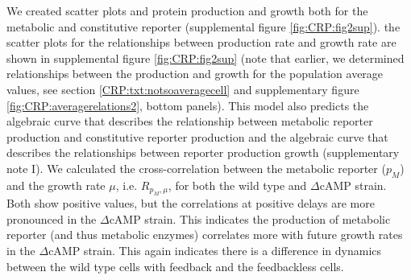 We created scatter plots and  protein production and growth  
both for the metabolic and constitutive reporter (supplemental figure \ref{fig:CRP:fig2sup}).
%
the scatter plots for the relationships between production rate and growth rate are shown in supplemental figure \ref{fig:CRP:fig2sup}
(note that earlier, we determined relationships between the production and growth for the population average values, see section \ref{CRP:txt:notsoaveragecell} and supplementary figure \ref{fig:CRP:averagerelations2}, bottom panels).
%
This model also predicts the algebraic curve that describes the relationship between metabolic reporter production and constitutive reporter production 
and the algebraic curve that describes the relationships between reporter production growth (supplementary note I).
%
%
%
%
%
We calculated the cross-correlation between the metabolic reporter ($p_M$) and the growth rate $\mu$,
i.e. $R_{p_M,\mu}$,
for both the wild type and $\Delta$cAMP strain.
%
%
Both show positive values, 
but the correlations at positive delays are more pronounced in the $\Delta$cAMP strain.
%
%
%
This indicates the production of metabolic reporter (and thus metabolic enzymes)
correlates more with future growth rates in the $\Delta$cAMP strain.
%
This again indicates there is a difference in dynamics between the wild type cells with feedback and the feedbackless cells.



















